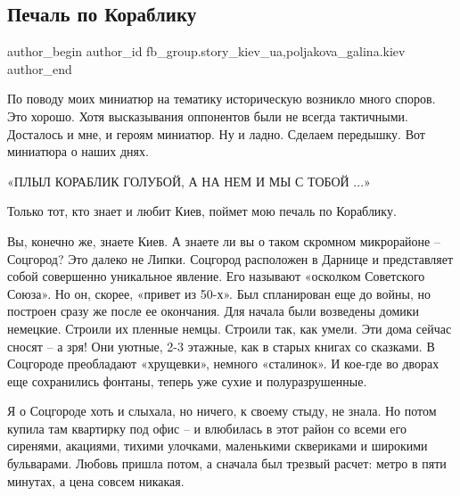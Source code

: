  
 
 
 
 
 
\subsection{Печаль по Кораблику}
\label{sec:26_12_2021.fb.fb_group.story_kiev_ua.4.pechal_po_korabliku}
 
\ifcmt
 author_begin
   author_id fb_group.story_kiev_ua,poljakova_galina.kiev
 author_end
\fi

По поводу моих миниатюр на тематику историческую возникло много споров. Это
хорошо. Хотя высказывания оппонентов были не всегда тактичными.  Досталось и
мне, и героям миниатюр. Ну и ладно. Сделаем передышку. Вот миниатюра о наших
днях. 

«ПЛЫЛ КОРАБЛИК ГОЛУБОЙ, 
А НА НЕМ И МЫ С ТОБОЙ ...»

Только тот, кто знает и любит Киев, поймет мою печаль по Кораблику. 

Вы, конечно же, знаете Киев. А знаете ли вы о таком скромном микрорайоне –
Соцгород? Это далеко не Липки. Соцгород расположен в Дарнице и представляет
собой совершенно уникальное явление. Его называют «осколком Советского Союза».
Но он, скорее, «привет из 50-х». Был спланирован еще до войны, но построен
сразу же после ее окончания. Для начала были возведены домики немецкие. Строили
их пленные немцы. Строили так, как умели. Эти дома сейчас сносят – а зря! Они
уютные, 2-3 этажные, как в старых книгах со сказками. В Соцгороде преобладают
«хрущевки», немного «сталинок». И кое-где во дворах еще сохранились фонтаны,
теперь уже сухие и полуразрушенные. 

Я о Соцгороде хоть и слыхала, но ничего, к своему стыду, не знала. Но потом
купила там квартирку под офис – и влюбилась в этот район со всеми его сиренями,
акациями, тихими улочками, маленькими сквериками и широкими бульварами. Любовь
пришла потом, а сначала был трезвый расчет: метро в пяти минутах, а цена совсем
никакая. 

